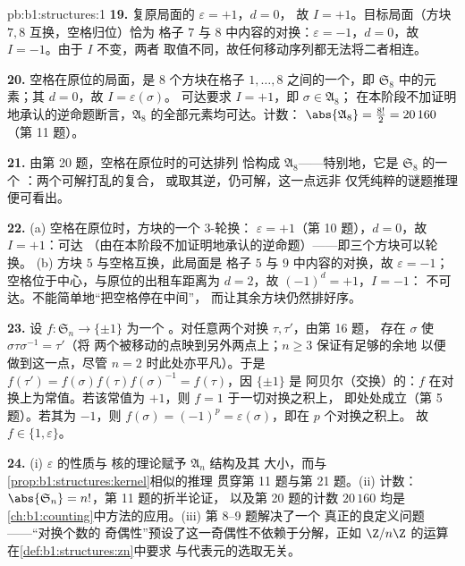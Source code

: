 \begin{solution}{pb:b1:structures:1}
\textbf{19.} 复原局面的 $\varepsilon = +1$，$d = 0$，
故 $I = +1$。目标局面（方块 $7, 8$ 互换，空格归位）恰为
格子 $7$ 与 $8$ 中内容的对换：$\varepsilon
= -1$，$d = 0$，故 $I = -1$。由于 $I$ 不变，两者
取值不同，故任何移动序列都无法将二者相连。

\textbf{20.} 空格在原位的局面，是
$8$ 个方块在格子 $1, \dots, 8$ 之间的一个，即
$\mathfrak S_8$ 中的元素；其 $d = 0$，故 $I = \varepsilon(\sigma)$。
可达要求 $I = +1$，即 $\sigma \in \mathfrak A_8$；
在本阶段不加证明地承认的逆命题断言，$\mathfrak A_8$ 的全部元素均可达。计数：
$\abs{\mathfrak A_8} = \frac{8!}2 = 20\,160$（第 11 题）。

\textbf{21.} 由第 20 题，空格在原位时的可达排列
恰构成 $\mathfrak A_8$——特别地，它是 $\mathfrak S_8$ 的一个
\emph{}：两个可解打乱的复合，
或取其逆，仍可解，这一点远非
仅凭纯粹的谜题推理便可看出。

\textbf{22.} (a) 空格在原位时，方块的一个 $3$-轮换：
$\varepsilon = +1$（第 10 题），$d = 0$，故 $I = +1$：可达
（由在本阶段不加证明地承认的逆命题）——即三个方块可以轮换。
(b) 方块 $5$ 与空格互换，此局面是
格子 $5$ 与 $9$ 中内容的对换，故
$\varepsilon = -1$；空格位于中心，与原位的出租车距离为
$d = 2$，故 $(-1)^d = +1$，$I = -1$：
不可达。不能简单地“把空格停在中间”，
而让其余方块仍然排好序。

\textbf{23.} 设 $f \colon \mathfrak S_n \to \{\pm1\}$ 为一个
。对任意两个对换 $\tau, \tau'$，由第 16 题，
存在 $\sigma$ 使 $\sigma\tau\sigma^{-1} = \tau'$（将
两个被移动的点映到另外两点上；$n \geq 3$ 保证有足够的余地
以便做到这一点，尽管 $n = 2$ 时此处亦平凡）。于是 $f(\tau') =
f(\sigma)f(\tau)f(\sigma)^{-1} = f(\tau)$，因 $\{\pm1\}$ 是
阿贝尔（交换）的：$f$ 在对换上为常值。若该常值为
$+1$，则 $f = 1$ 于一切对换之积上，
即处处成立（第 5 题）。若其为 $-1$，则 $f(\sigma) =
(-1)^p = \varepsilon(\sigma)$，即在 $p$ 个对换之积上。
故 $f \in \{1, \varepsilon\}$。

\textbf{24.} (i) $\varepsilon$ 的性质与
核的理论赋予 $\mathfrak A_n$ 结构及其
大小，而与\cref{prop:b1:structures:kernel}相似的推理
贯穿第 11 题与第 21 题。(ii) 计数：
$\abs{\mathfrak S_n} = n!$，第 11 题的折半论证，
以及第 20 题的计数 $20\,160$ 均是
\cref{ch:b1:counting}中方法的应用。(iii) 第 8--9 题解决了一个
真正的良定义问题——“对换个数的
奇偶性”预设了这一奇偶性不依赖于分解，正如
$\Z/n\Z$ 的运算在\cref{def:b1:structures:zn}中要求
与代表元的选取无关。


\end{solution}
